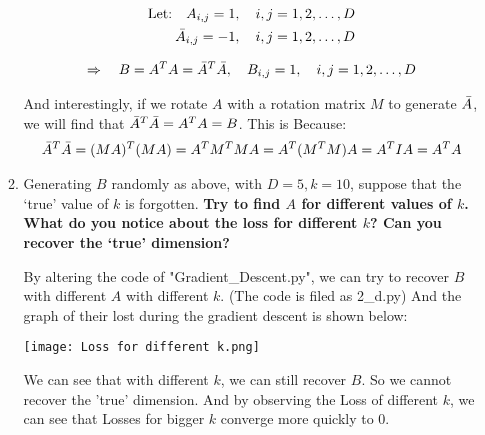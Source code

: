 \documentclass[11pt,letterpaper]{article}
\begin{document}
\begin{enumerate}
\begin{enumerate}
\begin{flushleft}
    
    \begin{align*}
        \text{Let:} \quad A_{i,j} = 1, \quad i,j = 1,2,\dots,D\\
        \quad \Bar{A}_{i,j} = -1, \quad i,j = 1,2,\dots,D\\
    \end{align*}
    
    \begin{align*}
        \Rightarrow \quad B=A^TA=\Bar{A}^T\Bar{A},\quad B_{i,j} = 1, \quad i,j = 1,2,\dots,D
    \end{align*}
    
    \end{flushleft}

    \begin{flushleft}
            \justifying And interestingly, if we rotate $A$ with a rotation matrix $M$ to generate $\Bar{A}$, we will find that $\Bar{A}^T\Bar{A} = A^TA = B$. This is Because:
            \begin{align*}
                \Bar{A}^T\Bar{A} = (MA)^T(MA) = A^TM^TMA = A^T(M^TM)A =A^TIA = A^TA 
            \end{align*}
    \end{flushleft}

    \item 
    Generating $B$ randomly as above, with $D = 5, k = 10$, suppose that the ‘true’ value of $k$ is forgotten. 
    \textbf{
     Try to find $A$ for different values of $k$. What do you notice about the loss for different $k$? Can you recover the ‘true’ dimension?
    }
    \begin{flushleft}
        \justifying
        By altering the code of "Gradient\_Descent.py", we can try to recover $B$ with different $A$ with different $k$. (The code is filed as 2\_d.py) And the graph of their lost during the gradient descent is shown below:
    \end{flushleft}
    \begin{center}
        \texttt{[image: Loss for different k.png]}
    \end{center}
    \begin{flushleft}
        \justifying
        We can see that with different $k$, we can still recover $B$. So we cannot recover the 'true' dimension. And by observing the Loss of different $k$, we can see that Losses for bigger $k$ converge more quickly to 0. 
    \end{flushleft}


\end{enumerate}
\end{enumerate}
\end{document}

